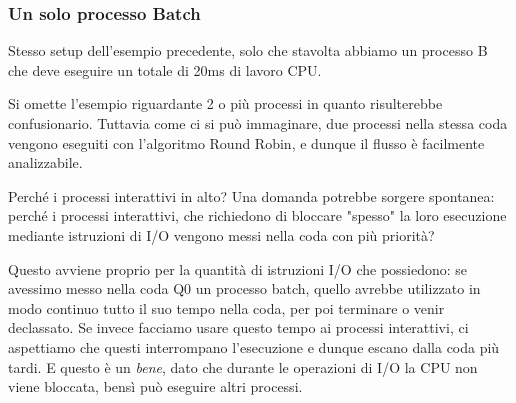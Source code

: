 \documentclass[12pt]{report}
\begin{document}
	\subsubsection*{Un solo processo Batch}
	Stesso setup dell'esempio precedente, solo che stavolta abbiamo un processo B che deve eseguire un totale di 20ms di lavoro CPU.
	\begin{figure}[H]
		\centering
	\end{figure}
	
	Si omette l'esempio riguardante 2 o più processi in quanto risulterebbe confusionario. Tuttavia come ci si può immaginare, due processi nella stessa coda vengono eseguiti con l'algoritmo Round Robin, e dunque il flusso è facilmente analizzabile.
	
	\begin{osservazione}{Perché i processi interattivi in alto?}{}
		Una domanda potrebbe sorgere spontanea: perché i processi interattivi, che richiedono di bloccare "spesso" la loro esecuzione mediante istruzioni di I/O vengono messi nella coda con più priorità?
		\smallbreak
		
		Questo avviene proprio per la quantità di istruzioni I/O che possiedono: se avessimo messo nella coda Q0 un processo batch, quello avrebbe utilizzato in modo continuo tutto il suo tempo nella coda, per poi terminare o venir declassato. Se invece facciamo usare questo tempo ai processi interattivi, ci aspettiamo che questi interrompano l'esecuzione e dunque escano dalla coda più tardi. E questo è un \textit{bene}, dato che durante le operazioni di I/O la CPU non viene bloccata, bensì può eseguire altri processi.
	\end{osservazione}
	
\end{document}
